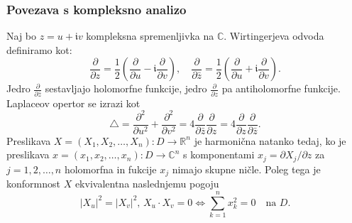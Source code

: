 \documentclass[8pt]{beamer}
\theoremstyle{definition}
\theoremstyle{remark}
\theoremstyle{plain}
\numberwithin{equation}{section}  %
\begin{document}
\begin{frame}
    \frametitle{Povezava s kompleksno analizo}

    Naj bo $z=u+\mathfrak{i} v$ kompleksna spremenljivka na $\mathbb{C}$. \textcolor{red1}{Wirtingerjeva odvoda} definiramo kot:
    \begin{equation*}
        \frac{\partial}{\partial z}=\frac{1}{2}\left(\frac{\partial}{\partial u}-\mathfrak{i} \frac{\partial}{\partial v}\right), \quad \frac{\partial}{\partial \bar{z}}=\frac{1}{2}\left(\frac{\partial}{\partial u}+\mathfrak{i} \frac{\partial}{\partial v}\right).
    \end{equation*}
    Jedro $\frac{\partial}{\partial \bar{z}}$ sestavljajo holomorfne funkcije, jedro $\frac{\partial}{\partial z}$ pa antiholomorfne funkcije. \pause Laplaceov opertor se izrazi kot 
    \begin{equation*}
        \bigtriangleup=\frac{\partial^2}{\partial u^2}+\frac{\partial^2}{\partial v^2}=4 \frac{\partial}{\partial \bar{z}} \frac{\partial}{\partial z}=4 \frac{\partial}{\partial z} \frac{\partial}{\partial \bar{z}} .
    \end{equation*} 
    \pause
    Preslikava $X=(X_1, X_2, \ldots, X_n): D \rightarrow \mathbb{R}^n$ je harmonična natanko tedaj, ko je preslikava $x=\left(x_1, x_2, \ldots, x_n\right): D \rightarrow \mathbb{C}^n$ s komponentami $x_j=\partial X_j / \partial z$ za $j=1,2, \ldots, n$ holomorfna in fukcije $x_j$ nimajo skupne ničle. Poleg tega je konformnost $X$ ekvivalentna naslednjemu pogoju
    \begin{equation*}
        \left| X_u \right|^2 = \left| X_v \right|^2, \, X_u\cdot X_v=0 \iff \sum_{k=1}^n x_k^2 = 0 \quad \text{na }D.
    \end{equation*}


\end{frame}
\end{document}
